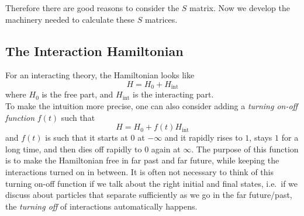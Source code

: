 \documentclass[11pt, notitlepage]{report}
\numberwithin{equation}{section}
\begin{document}
    Therefore there are good reasons to consider the \(S\) matrix. Now we develop the machinery needed to calculate these \(S\) matrices. 

    \subsection{The Interaction Hamiltonian}
    For an interacting theory, the Hamiltonian looks like 
    \begin{equation*}
        H = H_0 + H_{\text{int}}
    \end{equation*}
    where \(H_0\) is the free part, and \(H_{\text{int}}\) is the interacting part. \\
    To make the intuition more precise, one can also consider adding a \textit{turning on-off function} \(f(t)\) such that 
    \begin{equation*}
        H = H_0 + f(t) H_{\text{int}}
    \end{equation*}
    and \(f(t)\) is such that it starts at \(0\) at \(-\infty\) and it rapidly rises to \(1\), stays \(1\) for a long time, and then dies off rapidly to \(0\) again at \(\infty\). The purpose of this function is to make the Hamiltonian free in far past and far future, while keeping the interactions turned on in between. It is often not necessary to think of this turning on-off function if we talk about the right initial and final states, i.e.\ if we discuss about particles that separate sufficiently as we go in the far future/past, the \textit{turning off} of interactions automatically happens.\\
\end{document}
